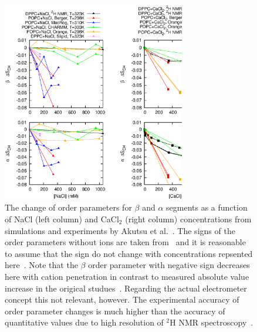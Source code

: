 \documentclass[pre,aps,floatfix,authordate1-4,twocolumn]{revtex4-1}
\begin{document}
\begin{figure}[]
  \centering
  \includegraphics[width=8cm]{../Fig/OrderParameterIONSchanges.eps}
  \caption{\label{ordPions}
    The change of order parameters for $\beta$ and $\alpha$ segments as a function of NaCl (left column) and CaCl$_2$ (right column) concentrations from simulations 
    and experiments by Akutsu et al.~\cite{akutsu81}. The signs of the order parameters without ions are taken from~\cite{hong95a,hong95b,gross97} and it is reasonable
    to assume that the sign do not change with concentrations repsented here~\cite{altenbach84}. Note that the $\beta$ order parameter with negative sign decreases here with cation
    penetration in contrast to measured absolute value increase in the origical studues~\cite{akutsu81,altenbach84}.
    Regarding the actual electrometer concept this not relevant, however. 
    The experimental accuracy of order parameter changes is much higher than the accuracy of quantitative values due to high resolution of $^2$H NMR spectroscopy~\cite{??}. 
   }
\end{figure}
\end{document}
